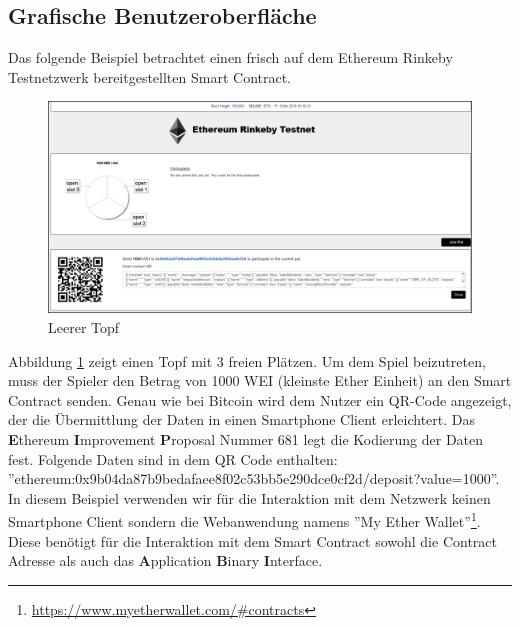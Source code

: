 \subsection{Grafische Benutzeroberfläche}

Das folgende Beispiel betrachtet einen frisch auf dem Ethereum Rinkeby Testnetzwerk bereitgestellten Smart Contract.


\begin{figure}[H]
\centering
\includegraphics[width=1\linewidth]{Figures/eth_gui/ETH_pot_empty}
\decoRule
\caption{Leerer Topf}
\label{fig:ETH_pot_empty}
\end{figure}
Abbildung \ref{fig:ETH_pot_empty} zeigt einen Topf mit 3 freien Plätzen. Um dem Spiel beizutreten, muss der Spieler den Betrag von 1000 WEI (kleinste Ether Einheit) an den Smart Contract senden. Genau wie bei Bitcoin wird dem Nutzer ein QR-Code angezeigt, der die Übermittlung der Daten in einen Smartphone Client erleichtert. Das \textbf{E}thereum \textbf{I}mprovement \textbf{P}roposal Nummer 681\citep{eip21} legt die Kodierung der Daten fest.
Folgende Daten sind in dem QR Code enthalten:\\ ''ethereum:0x9b04da87b9bedafaee8f02c53bb5e290dce0cf2d/deposit?value=1000''. In diesem Beispiel verwenden wir für die Interaktion mit dem Netzwerk keinen Smartphone Client sondern die Webanwendung namens ''My Ether Wallet''\footnote{\url{https://www.myetherwallet.com/\#contracts}}. Diese benötigt für die Interaktion mit dem Smart Contract sowohl die Contract Adresse als auch das \textbf{A}pplication \textbf{B}inary \textbf{I}nterface.


